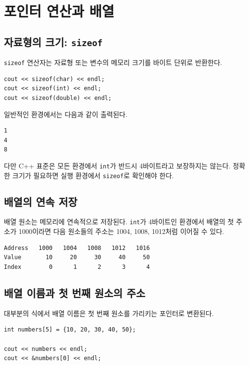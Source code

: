 \documentclass[11pt,a4paper]{article}
\begin{document}
\section{포인터 연산과 배열}

\subsection{자료형의 크기: \texttt{sizeof}}

\texttt{sizeof} 연산자는 자료형 또는 변수의 메모리 크기를 바이트 단위로 반환한다.

\begin{lstlisting}
cout << sizeof(char) << endl;
cout << sizeof(int) << endl;
cout << sizeof(double) << endl;
\end{lstlisting}

일반적인 환경에서는 다음과 같이 출력된다.

\begin{verbatim}
1
4
8
\end{verbatim}

다만 C++ 표준은 모든 환경에서 \texttt{int}가 반드시 4바이트라고 보장하지는 않는다. 정확한 크기가 필요하면 실행 환경에서 \texttt{sizeof}로 확인해야 한다.

\subsection{배열의 연속 저장}

배열 원소는 메모리에 연속적으로 저장된다. \texttt{int}가 4바이트인 환경에서 배열의 첫 주소가 1000이라면 다음 원소들의 주소는 1004, 1008, 1012처럼 이어질 수 있다.

\begin{verbatim}
Address   1000   1004   1008   1012   1016
Value       10     20     30     40     50
Index        0      1      2      3      4
\end{verbatim}

\subsection{배열 이름과 첫 번째 원소의 주소}

대부분의 식에서 배열 이름은 첫 번째 원소를 가리키는 포인터로 변환된다.

\begin{lstlisting}
int numbers[5] = {10, 20, 30, 40, 50};

cout << numbers << endl;
cout << &numbers[0] << endl;
\end{lstlisting}
\end{document}
